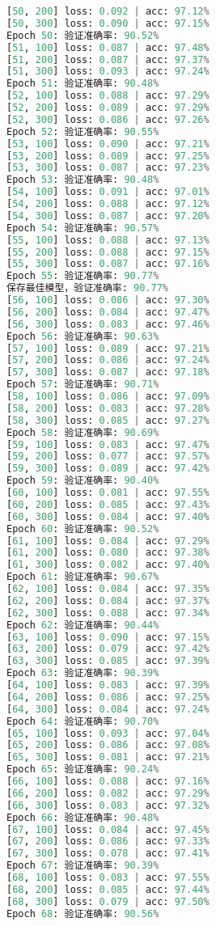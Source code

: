 \documentclass[UTF8]{report}
\theoremstyle{MyLineTheoremStyle} %
\theoremstyle{MyBlockTheoremStyle} %
\theoremstyle{MySubsubsectionStyle} %
\begin{document}
\begin{lstlisting}[language=python, caption={CNN训练结果一}, label={lst:cnn_train_result}]
[50, 200] loss: 0.092 | acc: 97.12%
[50, 300] loss: 0.090 | acc: 97.15%
Epoch 50: 验证准确率: 90.52%
[51, 100] loss: 0.087 | acc: 97.48%
[51, 200] loss: 0.087 | acc: 97.37%
[51, 300] loss: 0.093 | acc: 97.24%
Epoch 51: 验证准确率: 90.48%
[52, 100] loss: 0.088 | acc: 97.29%
[52, 200] loss: 0.089 | acc: 97.29%
[52, 300] loss: 0.086 | acc: 97.26%
Epoch 52: 验证准确率: 90.55%
[53, 100] loss: 0.090 | acc: 97.21%
[53, 200] loss: 0.089 | acc: 97.25%
[53, 300] loss: 0.087 | acc: 97.23%
Epoch 53: 验证准确率: 90.48%
[54, 100] loss: 0.091 | acc: 97.01%
[54, 200] loss: 0.088 | acc: 97.12%
[54, 300] loss: 0.087 | acc: 97.20%
Epoch 54: 验证准确率: 90.57%
[55, 100] loss: 0.088 | acc: 97.13%
[55, 200] loss: 0.088 | acc: 97.15%
[55, 300] loss: 0.087 | acc: 97.16%
Epoch 55: 验证准确率: 90.77%
保存最佳模型，验证准确率: 90.77%
[56, 100] loss: 0.086 | acc: 97.30%
[56, 200] loss: 0.084 | acc: 97.47%
[56, 300] loss: 0.083 | acc: 97.46%
Epoch 56: 验证准确率: 90.63%
[57, 100] loss: 0.089 | acc: 97.21%
[57, 200] loss: 0.086 | acc: 97.24%
[57, 300] loss: 0.087 | acc: 97.18%
Epoch 57: 验证准确率: 90.71%
[58, 100] loss: 0.086 | acc: 97.09%
[58, 200] loss: 0.083 | acc: 97.28%
[58, 300] loss: 0.085 | acc: 97.27%
Epoch 58: 验证准确率: 90.69%
[59, 100] loss: 0.083 | acc: 97.47%
[59, 200] loss: 0.077 | acc: 97.57%
[59, 300] loss: 0.089 | acc: 97.42%
Epoch 59: 验证准确率: 90.40%
[60, 100] loss: 0.081 | acc: 97.55%
[60, 200] loss: 0.085 | acc: 97.43%
[60, 300] loss: 0.084 | acc: 97.40%
Epoch 60: 验证准确率: 90.52%
[61, 100] loss: 0.084 | acc: 97.29%
[61, 200] loss: 0.080 | acc: 97.38%
[61, 300] loss: 0.082 | acc: 97.40%
Epoch 61: 验证准确率: 90.67%
[62, 100] loss: 0.084 | acc: 97.35%
[62, 200] loss: 0.084 | acc: 97.37%
[62, 300] loss: 0.088 | acc: 97.34%
Epoch 62: 验证准确率: 90.44%
[63, 100] loss: 0.090 | acc: 97.15%
[63, 200] loss: 0.079 | acc: 97.42%
[63, 300] loss: 0.085 | acc: 97.39%
Epoch 63: 验证准确率: 90.39%
[64, 100] loss: 0.083 | acc: 97.39%
[64, 200] loss: 0.086 | acc: 97.25%
[64, 300] loss: 0.084 | acc: 97.24%
Epoch 64: 验证准确率: 90.70%
[65, 100] loss: 0.093 | acc: 97.04%
[65, 200] loss: 0.086 | acc: 97.08%
[65, 300] loss: 0.081 | acc: 97.21%
Epoch 65: 验证准确率: 90.24%
[66, 100] loss: 0.088 | acc: 97.16%
[66, 200] loss: 0.082 | acc: 97.29%
[66, 300] loss: 0.083 | acc: 97.32%
Epoch 66: 验证准确率: 90.48%
[67, 100] loss: 0.084 | acc: 97.45%
[67, 200] loss: 0.086 | acc: 97.33%
[67, 300] loss: 0.078 | acc: 97.41%
Epoch 67: 验证准确率: 90.39%
[68, 100] loss: 0.083 | acc: 97.55%
[68, 200] loss: 0.085 | acc: 97.44%
[68, 300] loss: 0.079 | acc: 97.50%
Epoch 68: 验证准确率: 90.56%

\end{lstlisting}
\end{document}
